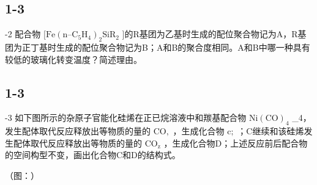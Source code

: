 \subsection*{1-3}
-2 配合物 $\mathrm { { [ F e ( n – C _ { 5 } H _ { 4 } ) _ { 2 } S i R _ { 2 } } }$ ]的R基团为⼄基时⽣成的配位聚合物记为A，R基团为正丁基时⽣成的配位聚合物记为B；A和B的聚合度相同。A和B中哪⼀种具有较低的玻璃化转变温度？简述理由。

\subsection*{1-3}
-3 如下图所⽰的杂原⼦官能化硅烯在正已烷溶液中和羰基配合物 $\mathrm { N i ( C O ) _ { 4 } }$ _{4}，发⽣配体取代反应释放出等物质的量的 $\mathrm { C O } ,$ ，⽣成化合物 $\mathrm { c } ;$ ；C继续和该硅烯发⽣配体取代反应释放出等物质的量的 $\mathrm { C O } _ { \mathrm { { z } } }$ ，⽣成化合物D；上述反应前后配合物的空间构型不变，画出化合物C和D的结构式。

（图：）
